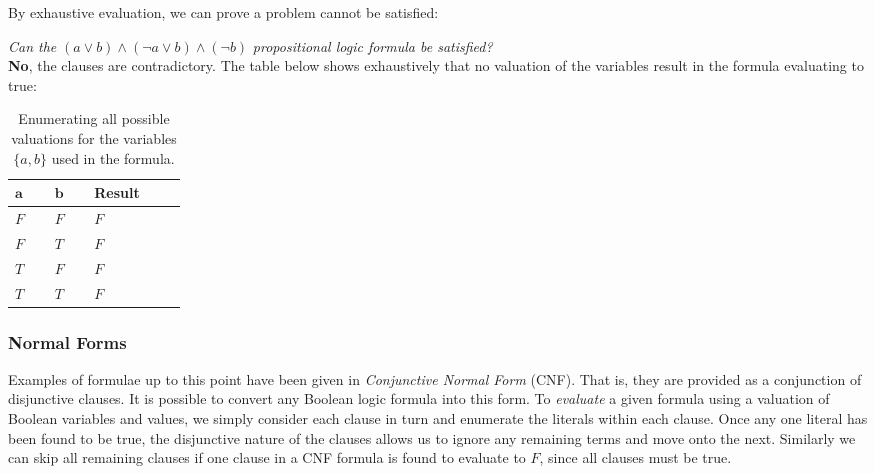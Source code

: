 \documentclass[a4paper,openany,12pt]{book}
\begin{document}
By exhaustive evaluation, we can prove a problem cannot be satisfied:

\emph{Can the} \(
    (a \lor b) \land (\neg a \lor b) \land (\neg b)
\) \emph{propositional logic formula be satisfied?}\\

\textcolor{id7-ruby-red}{\textbf{No}}, the clauses are contradictory.
The table below shows exhaustively that no valuation of the variables result in the formula evaluating to true:

\def\arraystretch{1.5}%
\begin{table}[H]
    \centering
    \begin{tabular}[t]{|p{0.05\linewidth}|p{0.05\linewidth}|p{0.1\linewidth}|}
        \hline
        \rowcolor{id7-aubergine}
        {\color[HTML]{FFFFFF} $\mathbf{a}$} & {\color[HTML]{FFFFFF} $\mathbf{b}$} & {\color[HTML]{FFFFFF} \sffamily  \textbf{Result}} \\ \hline
        $F$ & $F$ & $F$  \\ \hline
        $F$ & $T$ & $F$  \\ \hline
        $T$ & $F$ & $F$  \\ \hline
        $T$ & $T$ & $F$  \\ \hline
    \end{tabular}
    \caption{Enumerating all possible valuations for the variables $\{a, b\}$ used in the formula.}
    \label{table:landingredesign}
\end{table}

\subsubsection{Normal Forms}

Examples of formulae up to this point have been given in \emph{Conjunctive Normal Form} (CNF).
That is, they are provided as a conjunction of disjunctive clauses.
It is possible to convert any Boolean logic formula into this form.
To \emph{evaluate} a given formula using a valuation of Boolean variables and values, we simply consider each clause in
turn and enumerate the literals within each clause.
Once any one literal has been found to be true, the disjunctive nature of the clauses allows us to ignore any remaining
terms and move onto the next.
Similarly we can skip all remaining clauses if one clause in a CNF formula is found to evaluate to $F$, since all
clauses must be true.
\end{document}
